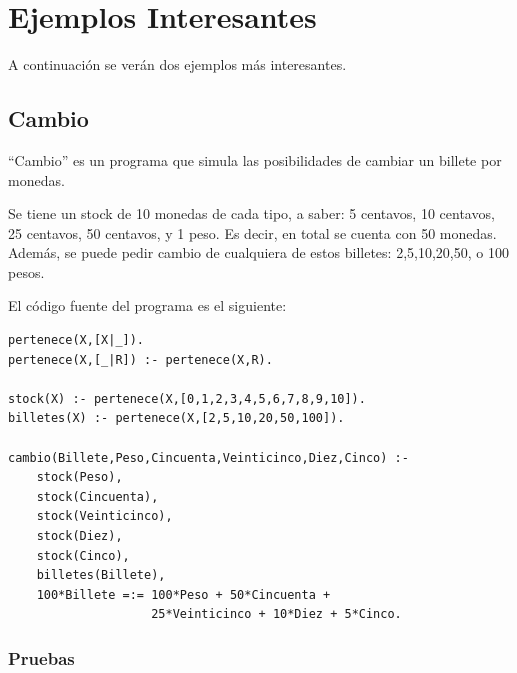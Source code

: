 \documentclass[12pt,titlepage]{article}
\begin{document}
\newpage
\section{Ejemplos Interesantes}

A continuación se verán dos ejemplos más interesantes.

\subsection{Cambio}

``Cambio'' es un programa que simula las posibilidades de cambiar un billete por monedas.

Se tiene un stock de 10 monedas de cada tipo, a saber: 5 centavos, 10 centavos, 25 centavos, 50 centavos, y 1 peso. Es decir, en total se cuenta con 50 monedas. Además, se puede pedir cambio de cualquiera de estos billetes: 2,5,10,20,50, o 100 pesos.

El código fuente del programa es el siguiente:
\begin{lstlisting}
pertenece(X,[X|_]).
pertenece(X,[_|R]) :- pertenece(X,R).

stock(X) :- pertenece(X,[0,1,2,3,4,5,6,7,8,9,10]).
billetes(X) :- pertenece(X,[2,5,10,20,50,100]).

cambio(Billete,Peso,Cincuenta,Veinticinco,Diez,Cinco) :-
	stock(Peso),
	stock(Cincuenta),
	stock(Veinticinco),
	stock(Diez),
	stock(Cinco),
	billetes(Billete),
	100*Billete =:= 100*Peso + 50*Cincuenta + 
	                25*Veinticinco + 10*Diez + 5*Cinco.
\end{lstlisting}

\subsubsection{Pruebas}
\end{document}
